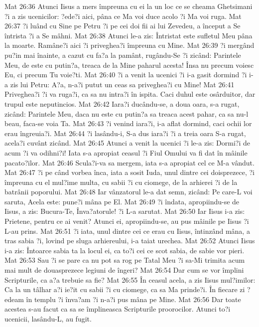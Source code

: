 Mat 26:36  Atunci Iisus a mers împreuna cu ei la un loc ce se cheama Ghetsimani ?i a zis ucenicilor: ?ede?i aici, pâna ce Ma voi duce acolo ?i Ma voi ruga.
Mat 26:37  ?i luând cu Sine pe Petru ?i pe cei doi fii ai lui Zevedeu, a început a Se întrista ?i a Se mâhni.
Mat 26:38  Atunci le-a zis: Întristat este sufletul Meu pâna la moarte. Ramâne?i aici ?i priveghea?i împreuna cu Mine.
Mat 26:39  ?i mergând pu?in mai înainte, a cazut cu fa?a la pamânt, rugându-Se ?i zicând: Parintele Meu, de este cu putin?a, treaca de la Mine paharul acesta! Însa nu precum voiesc Eu, ci precum Tu voie?ti.
Mat 26:40  ?i a venit la ucenici ?i i-a gasit dormind ?i i-a zis lui Petru: A?a, n-a?i putut un ceas sa priveghea?i cu Mine!
Mat 26:41  Priveghea?i ?i va ruga?i, ca sa nu intra?i în ispita. Caci duhul este osârduitor, dar trupul este neputincios.
Mat 26:42  Iara?i ducându-se, a doua oara, s-a rugat, zicând: Parintele Meu, daca nu este cu putin?a sa treaca acest pahar, ca sa nu-l beau, faca-se voia Ta.
Mat 26:43  ?i venind iara?i, i-a aflat dormind, caci ochii lor erau îngreuia?i.
Mat 26:44  ?i lasându-i, S-a dus iara?i ?i a treia oara S-a rugat, acela?i cuvânt zicând.
Mat 26:45  Atunci a venit la ucenici ?i le-a zis: Dormi?i de acum ?i va odihni?i! Iata s-a apropiat ceasul ?i Fiul Omului va fi dat în mâinile pacato?ilor.
Mat 26:46  Scula?i-va sa mergem, iata s-a apropiat cel ce M-a vândut.
Mat 26:47  ?i pe când vorbea înca, iata a sosit Iuda, unul dintre cei doisprezece, ?i împreuna cu el mul?ime multa, cu sabii ?i cu ciomege, de la arhierei ?i de la batrânii poporului.
Mat 26:48  Iar vânzatorul le-a dat semn, zicând: Pe care-L voi saruta, Acela este: pune?i mâna pe El.
Mat 26:49  ?i îndata, apropiindu-se de Iisus, a zis: Bucura-Te, Înva?atorule! ?i L-a sarutat.
Mat 26:50  Iar Iisus i-a zis: Prietene, pentru ce ai venit? Atunci ei, apropiindu-se, au pus mâinile pe Iisus ?i L-au prins.
Mat 26:51  ?i iata, unul dintre cei ce erau cu Iisus, întinzând mâna, a tras sabia ?i, lovind pe sluga arhiereului, i-a taiat urechea.
Mat 26:52  Atunci Iisus i-a zis: Întoarce sabia ta la locul ei, ca to?i cei ce scot sabia, de sabie vor pieri.
Mat 26:53  Sau ?i se pare ca nu pot sa rog pe Tatal Meu ?i sa-Mi trimita acum mai mult de douasprezece legiuni de îngeri?
Mat 26:54  Dar cum se vor împlini Scripturile, ca a?a trebuie sa fie?
Mat 26:55  În ceasul acela, a zis Iisus mul?imilor: Ca la un tâlhar a?i ie?it cu sabii ?i cu ciomege, ca sa Ma prinde?i. În fiecare zi ?edeam în templu ?i înva?am ?i n-a?i pus mâna pe Mine.
Mat 26:56  Dar toate acestea s-au facut ca sa se împlineasca Scripturile proorocilor. Atunci to?i ucenicii, lasându-L, au fugit.
